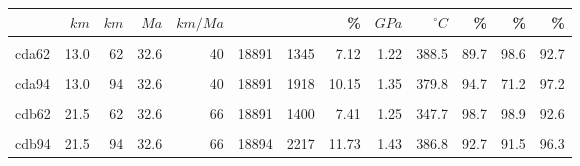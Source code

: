 \begin{landscape}
\begin{longtable}[t]{lrrrrrrrrrrrr}
\cmidrule(l{0pt}r{0pt}){1-1} \cmidrule(l{0pt}r{0pt}){2-2} \cmidrule(l{0pt}r{0pt}){3-3} \cmidrule(l{0pt}r{0pt}){4-4} \cmidrule(l{0pt}r{0pt}){5-5} \cmidrule(l{0pt}r{0pt}){6-6} \cmidrule(l{0pt}r{0pt}){7-7} \cmidrule(l{0pt}r{0pt}){8-8} \cmidrule(l{0pt}r{0pt}){9-9} \cmidrule(l{0pt}r{0pt}){10-10} \cmidrule(l{0pt}r{0pt}){11-11} \cmidrule(l{0pt}r{0pt}){12-12} \cmidrule(l{0pt}r{0pt}){13-13}
 & $km$ & $km$ & $Ma$ & $km/Ma$ &  &  & \% & $GPa$ & $^\circ C$ & \% & \% & \%\\
\midrule
\endhead

\endfoot
\bottomrule
\endlastfoot
\cellcolor{gray!6}{cda46} & \cellcolor{gray!6}{13.0} & \cellcolor{gray!6}{46} & \cellcolor{gray!6}{32.6} & \cellcolor{gray!6}{40} & \cellcolor{gray!6}{18891} & \cellcolor{gray!6}{1439} & \cellcolor{gray!6}{7.62} & \cellcolor{gray!6}{1.15} & \cellcolor{gray!6}{393.6} & \cellcolor{gray!6}{98.8} & \cellcolor{gray!6}{99.9} & \cellcolor{gray!6}{71.5}\\
cda62 & 13.0 & 62 & 32.6 & 40 & 18891 & 1345 & 7.12 & 1.22 & 388.5 & 89.7 & 98.6 & 92.7\\
\cellcolor{gray!6}{cda78} & \cellcolor{gray!6}{13.0} & \cellcolor{gray!6}{78} & \cellcolor{gray!6}{32.6} & \cellcolor{gray!6}{40} & \cellcolor{gray!6}{18891} & \cellcolor{gray!6}{1864} & \cellcolor{gray!6}{9.87} & \cellcolor{gray!6}{1.55} & \cellcolor{gray!6}{449.0} & \cellcolor{gray!6}{79.2} & \cellcolor{gray!6}{85.6} & \cellcolor{gray!6}{96.9}\\
cda94 & 13.0 & 94 & 32.6 & 40 & 18891 & 1918 & 10.15 & 1.35 & 379.8 & 94.7 & 71.2 & 97.2\\
\cellcolor{gray!6}{cdb46} & \cellcolor{gray!6}{21.5} & \cellcolor{gray!6}{46} & \cellcolor{gray!6}{32.6} & \cellcolor{gray!6}{66} & \cellcolor{gray!6}{18891} & \cellcolor{gray!6}{1723} & \cellcolor{gray!6}{9.12} & \cellcolor{gray!6}{1.38} & \cellcolor{gray!6}{392.2} & \cellcolor{gray!6}{96.3} & \cellcolor{gray!6}{99.7} & \cellcolor{gray!6}{82.3}\\
cdb62 & 21.5 & 62 & 32.6 & 66 & 18891 & 1400 & 7.41 & 1.25 & 347.7 & 98.7 & 98.9 & 92.6\\
\cellcolor{gray!6}{cdb78} & \cellcolor{gray!6}{21.5} & \cellcolor{gray!6}{78} & \cellcolor{gray!6}{32.6} & \cellcolor{gray!6}{66} & \cellcolor{gray!6}{18891} & \cellcolor{gray!6}{1872} & \cellcolor{gray!6}{9.91} & \cellcolor{gray!6}{1.54} & \cellcolor{gray!6}{337.4} & \cellcolor{gray!6}{99.0} & \cellcolor{gray!6}{95.9} & \cellcolor{gray!6}{98.5}\\
cdb94 & 21.5 & 94 & 32.6 & 66 & 18894 & 2217 & 11.73 & 1.43 & 386.8 & 92.7 & 91.5 & 96.3\\

\end{longtable}
\end{landscape}
